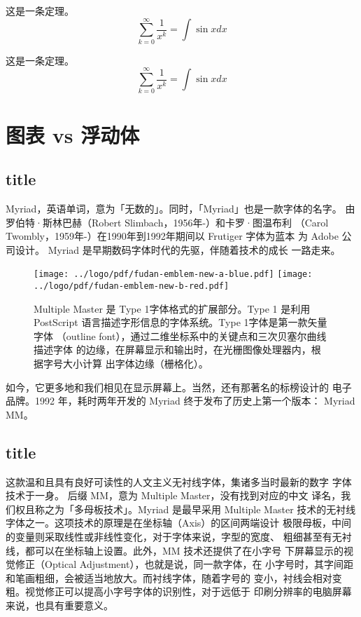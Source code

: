 \documentclass[twoside]{fduthesis}
\begin{document}
\begin{ncb}
这是一条定理。
\[ \sum_{k=0}^{\infty} \frac{1}{x^k} = \int \sin x dx \]
\end{ncb}

\begin{ncb}
这是一条定理。
\[ \sum_{k=0}^{\infty} \frac{1}{x^k} = \int \sin x dx \]
\end{ncb}

\chapter{图表 vs 浮动体}
\section{title}
Myriad，英语单词，意为「无数的」。同时，「Myriad」也是一款字体的名字。
由罗伯特·斯林巴赫（Robert Slimbach，1956年-）和卡罗·图温布利
（Carol Twombly，1959年-）在1990年到1992年期间以 Frutiger 字体为蓝本
为 Adobe 公司设计。 Myriad 是早期数码字体时代的先驱，伴随着技术的成长
一路走来。

\begin{figure}[h]
  \centering
  \texttt{[image: ../logo/pdf/fudan-emblem-new-a-blue.pdf]}
  \texttt{[image: ../logo/pdf/fudan-emblem-new-b-red.pdf]}
  \caption{Multiple Master 是 Type 1字体格式的扩展部分。Type 1 是利用
    PostScript 语言描述字形信息的字体系统。Type 1字体是第一款矢量字体
    （outline font），通过二维坐标系中的关键点和三次贝塞尔曲线描述字体
    的边缘，在屏幕显示和输出时，在光栅图像处理器内，根据字号大小计算
    出字体边缘（栅格化）。}
\end{figure}

如今，它更多地和我们相见在显示屏幕上。当然，还有那著名的标榜设计的
电子品牌。1992 年，耗时两年开发的 Myriad 终于发布了历史上第一个版本：
Myriad MM。

\section{title}
这款温和且具有良好可读性的人文主义无衬线字体，集诸多当时最新的数字
字体技术于一身。 后缀 MM，意为 Multiple Master，没有找到对应的中文
译名，我们权且称之为「多母板技术」。Myriad 是最早采用 Multiple Master
技术的无衬线字体之一。这项技术的原理是在坐标轴（Axis）的区间两端设计
极限母板，中间的变量则采取线性或非线性变化，对于字体来说，字型的宽度、
粗细甚至有无衬线，都可以在坐标轴上设置。此外，MM 技术还提供了在小字号
下屏幕显示的视觉修正（Optical Adjustment），也就是说，同一款字体，在
小字号时，其字间距和笔画粗细，会被适当地放大。而衬线字体，随着字号的
变小，衬线会相对变粗。视觉修正可以提高小字号字体的识别性，对于远低于
印刷分辨率的电脑屏幕来说，也具有重要意义。
\end{document}
